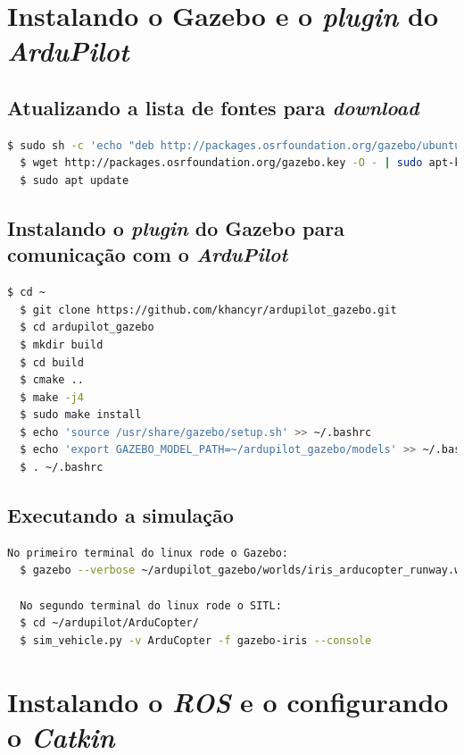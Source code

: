 \documentclass[12pt,a4paper,oneside]{book}
\begin{document}
\section{Instalando o Gazebo e o \textit{plugin} do \textit{ArduPilot}}

\subsection{Atualizando a lista de fontes para \textit{download}}
\begin{lstlisting}[language=bash]
  $ sudo sh -c 'echo "deb http://packages.osrfoundation.org/gazebo/ubuntu-stable `lsb_release -cs` main" > /etc/apt/sources.list.d/gazebo-stable.list'
  $ wget http://packages.osrfoundation.org/gazebo.key -O - | sudo apt-key add -
  $ sudo apt update
\end{lstlisting}

\subsection{Instalando o \textit{plugin} do Gazebo para comunicação com o \textit{ArduPilot}}
\begin{lstlisting}[language=bash]
  $ cd ~
  $ git clone https://github.com/khancyr/ardupilot_gazebo.git
  $ cd ardupilot_gazebo
  $ mkdir build
  $ cd build
  $ cmake ..
  $ make -j4
  $ sudo make install
  $ echo 'source /usr/share/gazebo/setup.sh' >> ~/.bashrc
  $ echo 'export GAZEBO_MODEL_PATH=~/ardupilot_gazebo/models' >> ~/.bashrc
  $ . ~/.bashrc
\end{lstlisting}

\subsection{Executando a simulação}
\begin{lstlisting}[language=bash]
  No primeiro terminal do linux rode o Gazebo: 
  $ gazebo --verbose ~/ardupilot_gazebo/worlds/iris_arducopter_runway.world
  
  No segundo terminal do linux rode o SITL:
  $ cd ~/ardupilot/ArduCopter/
  $ sim_vehicle.py -v ArduCopter -f gazebo-iris --console
\end{lstlisting}

\section{Instalando o \textit{ROS} e o configurando o \textit{Catkin}}
\end{document}
